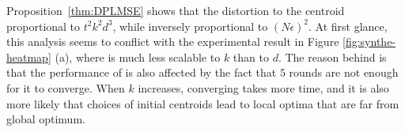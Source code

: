 Proposition~\ref{thm:DPLMSE} shows that the distortion to the centroid proportional to $t^2k^2d^3$, while  inversely proportional to $(N\epsilon)^2$. At first glance, this analysis seems to conflict with the experimental result in Figure \ref{fig:synthe-heatmap} (a), where \dpl is much less scalable to $k$ than to $d$. The reason behind is that the performance of \dpl is also affected by the fact that $5$ rounds are not enough for it to converge.  When $k$ increases, converging takes more time, and it is also more likely that choices of initial centroids lead to local optima that are far from global optimum. 
 




\begin{comment}


\dpl runs $t$ iterations.  Within each round, the privacy budget needs to be divided among the count and the $d$ sum queries.  Suppose $\epsilon_0$ is allocated to the count query, and $\epsilon_i$ is allocated to the sum query for the $i$-th dimension, for each $i=1,2,\dots, d$.
While all dimensions should be treated equally, i.e., $\epsilon_1=\epsilon_2=\ldots=\epsilon_d$, an interesting question is what should be the right ratio of $\frac{\epsilon_i}{\epsilon_0}$.  This question has not answered before.
The \dpl approach allocates the privacy budget according to the sensitivities of different queries; thus $\frac{\epsilon_i}{\epsilon_0}=r$, assuming that each dimension is normalized to $[-r,r]$.  Thus, different $r$ values will result in different allocations of privacy budget.


This, however, is not optimal.  Plugging $\Var{\Delta S_i}=\frac{2r^2}{\epsilon_i^2}$ and $\Var{\Delta C}=\frac{2}{\epsilon_0^2}$ into Equation~\ref{eqn:DPLMSEoi}, one obtains
\begin{eqnarray}
\sum_{i=1}^d \mse{\widehat{o_i}} &\approx& \frac{k^2}{N^2} \sum_{i=1}^d\left( \Var{\Delta S_i} +  (2\beta r)^2 \cdot \Var{\Delta C} \right) \nonumber \\
&= & \frac{2r^2k^2}{N^2} \left(\sum_{i=1}^d \frac{1}{\epsilon_i^2} +  \frac{4d \beta^2}{\epsilon_0^2}\right ) \label{eqn:DPLMSEsumOi}
\end{eqnarray}
Minimization of the above \text{Subject to } $\sum_{i=1}^d \epsilon_i + \epsilon_0 = \epsilon/t$ can be solved using
the method of {\em Lagrange multipliers}.  The optimal proportion is
\begin{eqnarray}\label{eqn:sum_count_budget_ratio}
\epsilon_1 : \epsilon_2 :\dots : \epsilon_d:\epsilon_0= 1:1:\dots:1:\sqrt[3]{4d\beta^2}
\end{eqnarray}



\end{comment}

